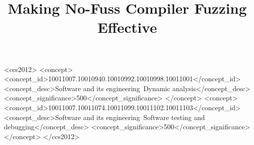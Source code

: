 \documentclass[sigplan,review]{acmart}
\begin{document}
\title{Making No-Fuss Compiler Fuzzing Effective}




\renewcommand{\shortauthors}{us folks}

\newcommand{\mr}[2]{\multirow{#1}{*}{#2}}
\newcommand{\mc}[3]{\multicolumn{#1}{#2}{#3}}

\newcommand{\clg}[1]{\textcolor{blue}{#1}}
\newcommand{\rvt}[1]{\textcolor{purple}{#1}}
\newcommand{\kj}[1]{\textcolor{olive}{#1}}

\begin{abstract}

\end{abstract}

\begin{CCSXML}
<ccs2012>
<concept>
<concept_id>10011007.10010940.10010992.10010998.10011001</concept_id>
<concept_desc>Software and its engineering~Dynamic analysis</concept_desc>
<concept_significance>500</concept_significance>
</concept>
<concept>
<concept_id>10011007.10011074.10011099.10011102.10011103</concept_id>
<concept_desc>Software and its engineering~Software testing and debugging</concept_desc>
<concept_significance>500</concept_significance>
</concept>
</ccs2012>
\end{CCSXML}




\maketitle










\balance




\balance
\end{document}
